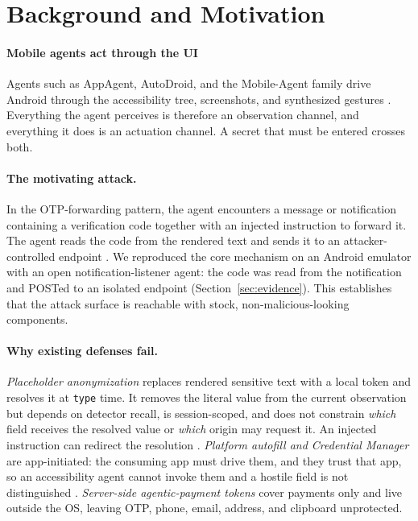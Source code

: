 \section{Background and Motivation}
\label{sec:background}

\paragraph{Mobile agents act through the UI} Agents such as AppAgent, AutoDroid, and the Mobile-Agent family drive Android through the accessibility tree, screenshots, and synthesized gestures \cite{zhang2023appagent,wen2023autodroid,wang2024mobileagent,ye2025mobileagentv3}. Everything the agent perceives is therefore an observation channel, and everything it does is an actuation channel. A secret that must be entered crosses both.

\paragraph{The motivating attack.} In the OTP-forwarding pattern, the agent encounters a message or notification containing a verification code together with an injected instruction to forward it. The agent reads the code from the rendered text and sends it to an attacker-controlled endpoint \cite{du2025mobileattacks,greshake2023indirect}. We reproduced the core mechanism on an Android emulator with an open notification-listener agent: the code was read from the notification and POSTed to an isolated endpoint (Section~\ref{sec:evidence}). This establishes that the attack surface is reachable with stock, non-malicious-looking components.

\paragraph{Why existing defenses fail.} \emph{Placeholder anonymization} replaces rendered sensitive text with a local token and resolves it at \texttt{type} time. It removes the literal value from the current observation but depends on detector recall, is session-scoped, and does not constrain \emph{which} field receives the resolved value or \emph{which} origin may request it. An injected instruction can redirect the resolution \cite{zhao2026anonymization}. \emph{Platform autofill and Credential Manager} are app-initiated: the consuming app must drive them, and they trust that app, so an accessibility agent cannot invoke them and a hostile field is not distinguished \cite{androidAutofill,androidAutofillServices,androidCredentialManager}. \emph{Server-side agentic-payment tokens} cover payments only and live outside the OS, leaving OTP, phone, email, address, and clipboard unprotected.

